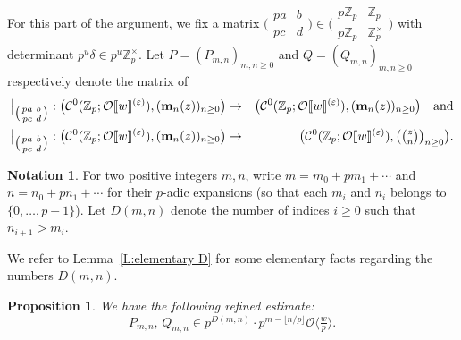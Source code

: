 \documentclass[12pt]{amsart}
\newtheorem{proposition}[subsection]{Proposition}
\theoremstyle{definition}
\newtheorem{notation}[subsection]{Notation}
\numberwithin{equation}{subsection}
\def\calC{\mathcal{C}}
\def\calO{\mathcal{O}}
\def\ZZ{\mathbb{Z}}
\def\bfm{\mathbf{m}}
\newcommand{\Matrix}[4]{{\big(\begin{smallmatrix}#1&#2\\#3& #4\end{smallmatrix} \big)}}
\begin{document}
For this part of the argument, we fix a matrix $\Matrix {pa}b{pc}d \in {\Matrix{p\ZZ_p}{\ZZ_p}{p\ZZ_p}{\ZZ_p^\times}}$ with determinant $p^u\delta \in p^u\ZZ_p^\times$.
Let $P = (P_{m,n})_{m, n \geq 0}$ and $Q = (Q_{m,n})_{m,n\geq 0}$  respectively denote the matrix of
\begin{eqnarray*}
\big|_{\Matrix {pa}b{pc}d}: \big( \calC^0(\ZZ_p; \calO\llbracket w\rrbracket^{(\varepsilon)}), (\bfm_n(z))_{n \geq 0}\big)
&\to& \big( \calC^0(\ZZ_p; \calO\llbracket w\rrbracket^{(\varepsilon)}), (\bfm_n(z))_{n \geq 0}\big) \quad \textrm{and}
\\
\big|_{\Matrix {pa}b{pc}d}: \big( \calC^0(\ZZ_p; \calO\llbracket w\rrbracket^{(\varepsilon)}), (\bfm_n(z))_{n \geq 0}\big)
&\to& \big( \calC^0(\ZZ_p; \calO\llbracket w\rrbracket^{(\varepsilon)}), \big(\tbinom zn\big)_{n \geq 0}\big).
\end{eqnarray*}


\begin{notation}\label{N:D(m,n)}
For two positive integers $m,n$, write $m = m_0+pm_1+\cdots$ and $n = n_0+pn_1+\cdots $ for their $p$-adic expansions (so that each $m_i$ and $n_i$ belongs to $\{0, \dots, p-1\}$).
Let $D(m,n)$ denote the number of indices $i\geq 0$ such that $n_{i+1} > m_i$.
\end{notation}

We refer to Lemma~\ref{L:elementary D} for some elementary facts regarding the numbers $D(m,n)$.




\begin{proposition}
\label{P:finer halo estimate}We have the following refined estimate:
\begin{equation}
\label{E:fine estimate of Pmn}
P_{m,n}, \,Q_{m,n} \in p^{D(m,n)} \cdot  p^{m-\lfloor n/p\rfloor} \calO\langle \tfrac wp\rangle.
\end{equation}
\end{proposition}
\end{document}
